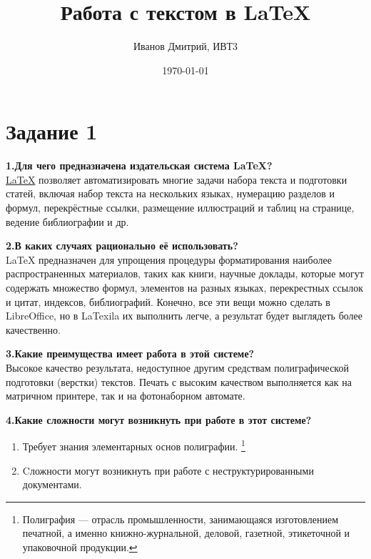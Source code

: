 \documentclass[a4paper,12pt]{article} %
\author{Иванов Дмитрий, ИВТ3}
\title{Работа с текстом в \LaTeX{}}
\date{\today}
\begin{document}
\maketitle
\newpage

\section{Задание 1}
\begin{flushright}
\textbf{1.Для чего предназначена издательская система \LaTeX?}\\
\href{https://ru.wikipedia.org/wiki/LaTeX}{\LaTeX} позволяет автоматизировать многие задачи набора текста и подготовки статей, включая набор текста на нескольких языках, нумерацию разделов и формул, перекрёстные ссылки, размещение иллюстраций и таблиц на странице, ведение библиографии и др.\\
\end{flushright}

\begin{center}
\textbf{2.В каких случаях рационально её использовать?}\\
LaTeX \LARGE{предназначен} \normalsize{для} упрощения процедуры форматирования наиболее распространенных материалов, таких как книги, научные доклады, которые могут содержать множество формул, элементов на разных языках, перекрестных ссылок и цитат, индексов, библиографий. Конечно, все эти вещи можно сделать в LibreOffice, но в LaTexila их выполнить легче, а результат будет выглядеть более качественно.\\
\end{center}

\begin{flushleft}
\textbf{3.Какие преимущества имеет работа в этой системе?}\\
Высокое качество результата, недоступное другим средствам полиграфической подготовки (верстки) текстов. Печать с высоким качеством выполняется как на матричном принтере, так и на фотонаборном автомате.\\
\end{flushleft}

\textbf{4.Какие сложности могут возникнуть при работе в этот системе?}
\begin{enumerate}
\item Требует знания элементарных основ полиграфии. \footnote{Полиграфия — отрасль промышленности, занимающаяся изготовлением печатной, а именно книжно-журнальной, деловой, газетной, этикеточной и упаковочной продукции.}
\item Cложности могут возникнуть при работе с неструктурированными документами. 
\end{enumerate}
\end{document}
